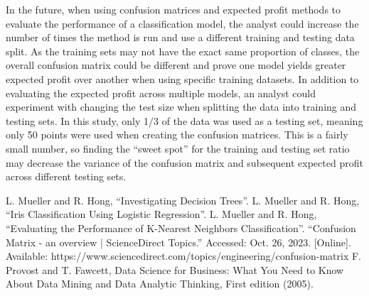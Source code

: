 \documentclass[journal]{IEEEtran}
\begin{document}
In the future, when using confusion matrices and expected profit methods to evaluate the performance of a classification model, the analyst could increase the number of times the method is run and use a different training and testing data split. As the training sets may not have the exact same proportion of classes, the overall confusion matrix could be different and prove one model yields greater expected profit over another when using specific training datasets. In addition to evaluating the expected profit across multiple models, an analyst could experiment with changing the test size when splitting the data into training and testing sets. In this study, only 1/3 of the data was used as a testing set, meaning only 50 points were used when creating the confusion matrices. This is a fairly small number, so finding the “sweet spot” for the training and testing set ratio may decrease the variance of the confusion matrix and subsequent expected profit across different testing sets. 

\begin{thebibliography}{00}
 L. Mueller and R. Hong, “Investigating Decision Trees”.
 L. Mueller and R. Hong, “Iris Classification Using Logistic Regression”.
 L. Mueller and R. Hong, “Evaluating the Performance of K-Nearest Neighbors Classification”.
 “Confusion Matrix - an overview | ScienceDirect Topics.” Accessed: Oct. 26, 2023. [Online]. Available: https://www.sciencedirect.com/topics/engineering/confusion-matrix
 F. Provost and T. Fawcett, Data Science for Business: What You Need to Know About Data Mining and Data Analytic Thinking, First edition (2005).

\end{thebibliography}
\end{document}
